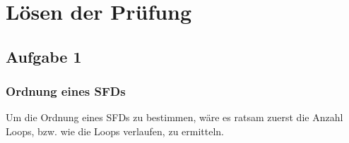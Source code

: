 \section{Lösen der Prüfung}
	\subsection{Aufgabe 1}
		\subsubsection{Ordnung eines SFDs}
			Um die Ordnung eines SFDs zu bestimmen, wäre es ratsam zuerst die Anzahl Loops, bzw. wie die Loops verlaufen, zu ermitteln. 
			
						
	\newpage